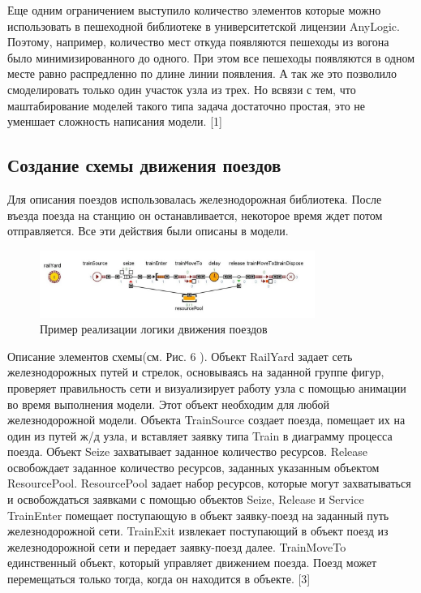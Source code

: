 \documentclass[12pt]{article}
\begin{document}
Еще одним ограничением выступило количество элементов которые можно использовать в пешеходной библиотеке в университетской лицензии AnyLogic. Поэтому, например, количество мест откуда появляются пешеходы из вогона было минимизированного до одного. При этом все пешеходы появляются в одном месте равно распредленно по длине линии появления. А так же это позволило смоделировать только один участок узла из трех. Но всвязи с тем, что маштабирование моделей такого типа задача достаточно простая, это не уменшает сложность написания модели.  [1]
   
		\subsection{Создание схемы движения поездов}
Для описания поездов использовалась железнодорожная библиотека. После въезда поезда на станцию он останавливается, некоторое время ждет потом отправляется. Все эти действия были описаны в модели. 
 \begin{figure}
  	\begin{center}
  	  	\includegraphics[width=0.8\textwidth]{train.jpg}
 	 \end{center}
	  	\caption{Пример реализации логики движения поездов}
\end{figure}

Описание элементов схемы(см. Рис. 6 ). Объект RailYard задает сеть железнодорожных путей и стрелок, основываясь на заданной группе фигур, проверяет правильность сети и визуализирует работу узла с помощью анимации во время выполнения модели. Этот объект необходим для любой железнодорожной модели. Объекта TrainSource создает поезда, помещает их на один из путей ж/д узла, и вставляет заявку типа Train в диаграмму процесса поезда. Объект Seize захватывает заданное количество ресурсов. Release освобождает заданное количество ресурсов, заданных указанным объектом ResourcePool. ResourcePool задает набор ресурсов, которые могут захватываться и освобождаться заявками с помощью объектов Seize, Release и Service TrainEnter помещает поступающую в объект заявку-поезд на заданный путь железнодорожной сети. TrainExit извлекает поступающий в объект поезд из железнодорожной сети и передает заявку-поезд далее. TrainMoveTo единственный объект, который управляет движением поезда. Поезд может перемещаться только тогда, когда он находится в объекте. [3]
\end{document}
